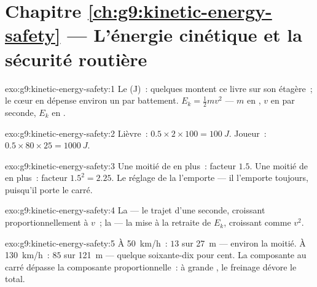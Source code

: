\section*{Chapitre \ref{ch:g9:kinetic-energy-safety} --- L'énergie cinétique et la sécurité routière}

\begin{solution}{exo:g9:kinetic-energy-safety:1}
Le  (\unit{J})~: quelques  montent ce livre sur son
étagère~; le cœur en dépense environ un par battement.
$E_k = \frac12 m v^2$ --- $m$ en , $v$ en  par
seconde, $E_k$ en .
\end{solution}

\begin{solution}{exo:g9:kinetic-energy-safety:2}
Lièvre~: $0.5 \times 2 \times 100 = \qty{100}{J}$. Joueur~:
$0.5 \times 80 \times 25 = \qty{1000}{J}$.
\end{solution}

\begin{solution}{exo:g9:kinetic-energy-safety:3}
Une moitié de  en plus~: facteur $1.5$. Une moitié de  en
plus~: facteur $1.5^2 = 2.25$. Le réglage de la  l'emporte ---
il l'emporte toujours, puisqu'il porte le carré.
\end{solution}

\begin{solution}{exo:g9:kinetic-energy-safety:4}
La  --- le trajet d'une seconde, croissant
proportionnellement à $v$~; la  --- la mise à la
retraite de $E_k$, croissant comme $v^2$.
\end{solution}

\begin{solution}{exo:g9:kinetic-energy-safety:5}
À \qty{50}{km/h}~: $13$ sur \qty{27}{m} --- environ la moitié. À
\qty{130}{km/h}~: $85$ sur \qty{121}{m} --- quelque soixante-dix pour
cent. La composante au carré dépasse la composante proportionnelle~:
à grande , le freinage dévore le total.
\end{solution}

